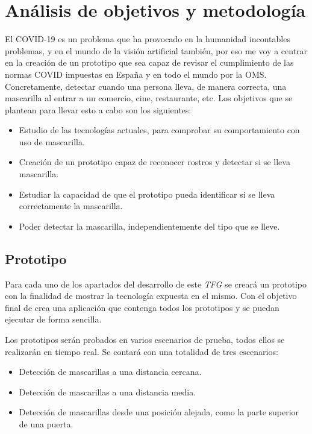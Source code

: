 
\lstset{frame=single,basicstyle=\ttfamily\small}

\chapter{Análisis de objetivos y metodología}

El COVID-19 es un problema que ha provocado en la humanidad incontables problemas, y en el mundo de la visión artificial también, por eso me voy a centrar en la creación de un prototipo que sea capaz de revisar el cumplimiento de las normas COVID impuestas en España y en todo el mundo por la OMS. Concretamente, detectar cuando una persona lleva, de manera correcta, una mascarilla al entrar a un comercio, cine, restaurante, etc. Los objetivos que se plantean para llevar esto a cabo son los siguientes:

\begin{itemize}
	\item Estudio de las tecnologías actuales, para comprobar su comportamiento con uso de mascarilla.
	\item Creación de un prototipo capaz de reconocer rostros y detectar si se lleva mascarilla.
	\item Estudiar la capacidad de que el prototipo pueda identificar si se lleva correctamente la mascarilla. 
	\item Poder detectar la mascarilla, independientemente del tipo que se lleve.
\end{itemize}

\section{Prototipo}

Para cada uno de los apartados del desarrollo de este \textit{TFG} se creará un prototipo con la finalidad de mostrar la tecnología expuesta en el mismo. Con el objetivo final de crea una aplicación que contenga todos los prototipos y se puedan ejecutar de forma sencilla. 

Los prototipos serán probados en varios escenarios de prueba, todos ellos se realizarán en tiempo real. Se contará con una totalidad de tres escenarios:

\begin{itemize}
	\item Detección de mascarillas a una distancia cercana.
	\item Detección de mascarillas a una distancia media.
	\item Detección de mascarillas desde una posición alejada, como la parte superior de una puerta.
\end{itemize}

